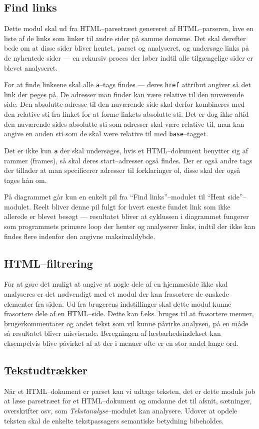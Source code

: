 \documentclass[a4paper,oneside,article]{memoir}
\begin{document}
\subsection{Find links}
Dette modul skal ud fra HTML--parsetræet genereret af HTML--parseren,
lave en liste af de links som linker til andre sider på samme domæne.
Det skal derefter bede om at disse sider bliver hentet, parset og
analyseret, og undersøge links på de nyhentede sider --- en rekursiv
proces der løber indtil alle tilgængelige sider er blevet analyseret.

For at finde linksene skal alle \texttt{a}--tags findes --- deres
\texttt{href} attribut angiver så det link der peges på. De adresser
man finder kan være relative til den nuværende side. Den absolutte
adresse til den nuværende side skal derfor kombineres med den relative
sti fra linket for at forme linkets absolutte sti. Det er dog ikke
altid den nuværende sides absolutte sti som adresser skal være
relative til, man kan angive en anden sti som de skal være relative
til med \texttt{base}--tagget.

Det er ikke kun \texttt{a} der skal undersøges, hvis et HTML--dokument
benytter sig af rammer (frames), så skal deres start--adresser også
findes. Der er også andre tags der tillader at man specificerer
adresser til forklaringer ol, disse skal der også tages hån om.

På diagrammet går kun en enkelt pil fra ``Find links''--modulet til
``Hent side''--modulet. Reelt bliver denne pil fulgt for hvert eneste
fundet link som ikke allerede er blevet besøgt --- resultatet bliver at
cyklussen i diagrammet fungerer som programmets primære loop der
henter og analyserer links, indtil der ikke kan findes flere indenfor
den angivne maksimaldybde.

\subsection{HTML--filtrering}
For at gøre det muligt at angive at nogle dele af en hjemmeside ikke
skal analyseres er det nødvendigt med et modul der kan frasortere de
ønskede elementer fra siden. Ud fra brugerens indstillinger skal dette
modul kunne frasortere dele af en HTML--side. Dette kan f.eks. bruges
til at frasortere menuer, brugerkommentarer og andet tekst som vil
kunne påvirke analysen, på en måde så resultatet bliver
misvisende. Beregningen af læsbarhedsindekset kan eksempelvis blive
påvirket af at der i menuer ofte er en stor andel lange ord.

\subsection{Tekstudtrækker}
Når et HTML--dokument er parset kan vi udtage teksten, det er dette
moduls job at læse parsetræet for et HTML--dokument og omdanne det til
afsnit, sætninger, overskrifter osv, som \textit{Tekstanalyse}--modulet
kan analysere. Udover at opdele teksten skal de enkelte tekstpassagers
semantiske betydning bibeholdes.
\end{document}
